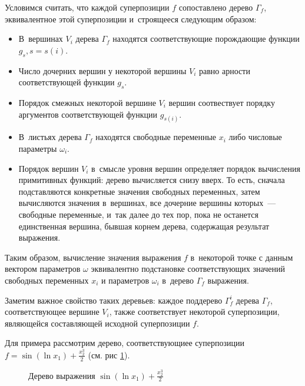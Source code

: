 \documentclass[12pt,a4paper]{amsart}
\begin{document}
Условимся считать, что каждой суперпозиции $f$ сопоставлено дерево $\Gamma_f$,
эквивалентное этой суперпозиции и~строящееся следующим образом:

\begin{itemize}
  \item В~вершинах $V_i$ дерева $\Gamma_f$ находятся соответствующие
	порождающие функции $g_s, s = s(i)$.
  \item Число дочерних вершин у некоторой вершины $V_i$ равно арности
	соответствующей функции $g_s$.
  \item Порядок смежных некоторой вершине $V_i$ вершин соотвествует порядку
	аргументов соответствующей функции $g_{s(i)}$.
  \item В~листьях дерева $\Gamma_f$ находятся свободные переменные $x_i$
	либо числовые параметры $\omega_i$.
  \item Порядок вершин $V_i$ в~смысле уровня вершин определяет порядок
	вычисления примитивных функций: дерево вычисляется снизу вверх.
	То есть, сначала подставляются конкретные значения свободных переменных,
	затем вычисляются значения в~вершинах, все дочерние вершины которых~---
	свободные переменные, и~так далее до тех пор, пока не останется
	единственная вершина, бывшая корнем дерева, содержащая результат выражения.
\end{itemize}

Таким образом, вычисление значения выражения $f$ в~некоторой точке с данным
вектором параметров $\omega$ эквивалентно подстановке соответствующих
значений свободных переменных $x_i$ и параметров $\omega_i$ в~дерево
$\Gamma_f$ выражения.

Заметим важное свойство таких деревьев: каждое поддерево $\Gamma_f^i$
дерева $\Gamma_f$, соответствующее вершине $V_i$, также соответствует
некоторой суперпозиции, являющейся составляющей исходной суперпозиции $f$.

Для примера рассмотрим дерево, соответствующиее суперпозиции
$f = \sin (\ln x_1) + \frac{x_2^3}{2}$ (см. рис \ref{fig:expr_tree_example}).

\begin{figure}[h]
  \caption{Дерево выражения $\sin (\ln x_1) + \frac{x_2^3}{2}$}
  \label{fig:expr_tree_example}
\end{figure}
\end{document}

